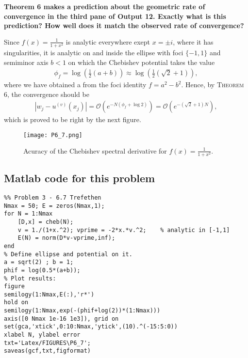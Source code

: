 \textbf{Theorem 6 makes a prediction about the geometric rate of convergence in the third pane of Output 12. Exactly what is this prediction? How well does it match the observed rate of convergence?}
\newline


Since $f(x) = \frac{1}{1+x^2}$ is analytic everywhere exept $x=\pm i$, where it has singularities, it is analytic on and inside the ellipse with foci $\{-1,1\}$ and semiminor axis $b < 1$ on which the Chebishev potential takes the value
\begin{align*}
\phi_f = \log\left(\frac{1}{2}(a+b)\right) \approx \log\left(\frac{1}{2}(\sqrt{2}+1)\right),
\end{align*}
where we have obtained a from the foci identity $ f = a^2 - b^2$. Hence, by \textsc{Theorem 6}, the convergence should be
\begin{align*}
|w_j-u^{(v)}(x_j)| = \mathcal{O}\left(e^{-N(\phi_f+\log{2})}\right) = \mathcal{O}\left(e^{-(\sqrt{2}+1)N}\right),
\end{align*}
which is proved to be right by the next figure.
\begin{figure}[H]
\centering
\texttt{[image: P6\_7.png]}\caption{Acuracy of the Chebishev spectral derivative for $f(x) = \frac{1}{1+x^2}$.}
\end{figure}

\subsection*{Matlab code for this problem}
\begin{verbatim}
%% Problem 3 - 6.7 Trefethen
Nmax = 50; E = zeros(Nmax,1);
for N = 1:Nmax
    [D,x] = cheb(N);
    v = 1./(1+x.^2); vprime = -2*x.*v.^2;    % analytic in [-1,1]
    E(N) = norm(D*v-vprime,inf);
end
% Define ellipse and potential on it.
a = sqrt(2) ; b = 1;
phif = log(0.5*(a+b));
% Plot results:
figure
semilogy(1:Nmax,E(:),'r*')
hold on
semilogy(1:Nmax,exp(-(phif+log(2))*(1:Nmax)))
axis([0 Nmax 1e-16 1e3]), grid on
set(gca,'xtick',0:10:Nmax,'ytick',(10).^(-15:5:0))
xlabel N, ylabel error
txt='Latex/FIGURES\P6_7';
saveas(gcf,txt,figformat)
\end{verbatim}
